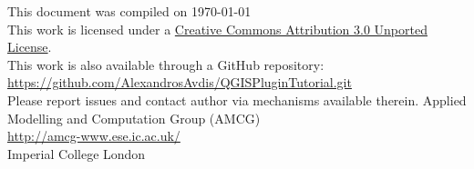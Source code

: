 \documentclass[11pt,a4paper,twoside,openany]{article}
\begin{document}
\thispagestyle{empty}
\begin{center}
This document was compiled on \today\\[30pt]
This work is licensed under a \href{http://creativecommons.org/licenses/by/3.0/deed.en_GB}{Creative Commons Attribution 3.0 Unported License}.\\[30pt]
This work is also available through a GitHub repository: \url{https://github.com/AlexandrosAvdis/QGISPluginTutorial.git}\\Please report issues and contact author via mechanisms available therein.
\vfill
{\footnotesize
Applied Modelling and Computation Group (AMCG)\\[10pt]
\url{http://amcg-www.ese.ic.ac.uk/}\\
Imperial College London}
\end{center}
\pagebreak

\setlength{\textwidth}{390pt}
\setlength{\textheight}{592pt}
\setlength{\topmargin}{-0.5in}
\setlength{\headsep}{10mm}
\setlength{\textheight}{240mm}
\setlength{\oddsidemargin}{4mm}
\setlength{\evensidemargin}{-4.mm}









\begin{appendices}

\end{appendices}



\end{document}
